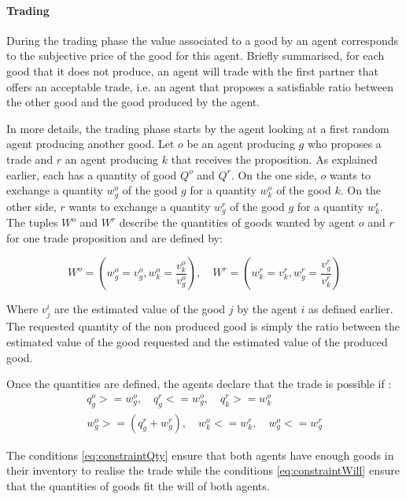 \documentclass{wscpaperproc}
\begin{document}
\paragraph{Trading} 
During the trading phase the value associated to a good by an agent corresponds to the subjective price of the good for this agent. Briefly summarised, for each good that it does not produce, an agent will trade with the first partner that offers an acceptable trade, i.e. an agent that proposes a satisfiable ratio between the other good and the good produced by the agent. 

In more details, the trading phase starts by the agent looking at a first random agent producing another good. 
Let $o$ be an agent producing $g$ who proposes a trade and $r$ an agent producing $k$ that receives the proposition. As explained earlier, each has a quantity of good $Q^o$ and $Q^r$. On the one side, $o$ wants to exchange a quantity $w_g^o$ of the good $g$ for a quantity $w_k^o$ of the good $k$. On the other side, $r$ wants to exchange a quantity $w_g^r$ of the good $g$ for a quantity $w_k^r$. The tuples $W^o$ and $W^r$ describe the quantities of goods wanted by agent $o$ and $r$ for one trade proposition and are defined by:  

\begin{equation}
	 W^o=(w_g^o = v_g^o,w_k^o= \frac{v_k^o}{v_g^o}), \quad
	 W^r=(w_k^r = v_k^r,w_g^r= \frac{v_g^r}{v_k^r}) 
	 \label{eq:trade}
\end{equation}

 Where $v_j^i$ are the estimated value of the good $j$ by the agent $i$ as defined earlier. 
The requested quantity of the non produced good is simply the ratio between the estimated value of the good requested and the estimated value of the produced good.


Once the quantities are defined, the agents declare that the trade is possible if :
\begin{align}
q_g^o >= w_g^o,\quad q_g^r <= w_g^o,\quad q_k^r >= w_k^o \label{eq:constraintQty}\\
w_g^o>=(q_g^r+w_g^r),\quad w_k^o<=w_k^r,\quad w_g^o<=w_g^r \label{eq:constraintWill}
\end{align}


The conditions \ref{eq:constraintQty} ensure that both agents have enough goods in their inventory to realise the trade while the conditions \ref{eq:constraintWill} ensure that the quantities of goods fit the will of both agents.
\end{document}
